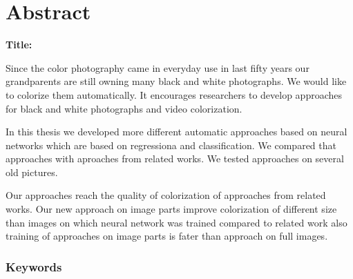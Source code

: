 \chapter*{Abstract}

\noindent\textbf{Title:} \ttitleEn
\bigskip

Since the color photography came in everyday use in last fifty years our grandparents are still owning many black and white photographs. We would like to colorize them automatically. It encourages researchers to develop approaches for black and white photographs and video colorization.

In this thesis we developed more different automatic approaches based on neural networks which are based on regressiona and classification. We compared that approaches with aproaches from related works. We tested approaches on several old pictures.

Our approaches reach the quality of colorization of approaches from related works. Our new approach on image parts improve colorization of different size than images on which neural network was trained compared to related work also training of approaches on image parts is fater than approach on full images.  


\subsection*{Keywords}
\textit{\tkeywordsEn}
\clearemptydoublepage